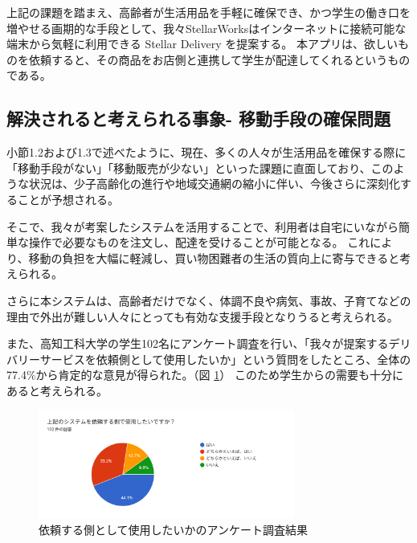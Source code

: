 上記の課題を踏まえ、高齢者が生活用品を手軽に確保でき、かつ学生の働き口を増やせる画期的な手段として、我々StellarWorksはインターネットに接続可能な端末から気軽に利用できる Stellar Delivery を提案する。
本アプリは、欲しいものを依頼すると、その商品をお店側と連携して学生が配達してくれるというものである。

\subsection{解決されると考えられる事象- 移動手段の確保問題}

小節1.2および1.3で述べたように、現在、多くの人々が生活用品を確保する際に「移動手段がない」「移動販売が少ない」といった課題に直面しており、このような状況は、少子高齢化の進行や地域交通網の縮小に伴い、今後さらに深刻化することが予想される。

そこで、我々が考案したシステムを活用することで、利用者は自宅にいながら簡単な操作で必要なものを注文し、配達を受けることが可能となる。
これにより、移動の負担を大幅に軽減し、買い物困難者の生活の質向上に寄与できると考えられる。

さらに本システムは、高齢者だけでなく、体調不良や病気、事故、子育てなどの理由で外出が難しい人々にとっても有効な支援手段となりうると考えられる。 

また、高知工科大学の学生102名にアンケート調査を行い、「我々が提案するデリバリーサービスを依頼側として使用したいか」という質問をしたところ、全体の77.4\%から肯定的な意見が得られた。（図 \ref{fig:アンケート2}） 
このため学生からの需要も十分にあると考えられる。 

\begin{figure}[H]
  \centering
  \includegraphics[width=0.75\textwidth]{依頼する側として使用したいか_アンケート結果.png}
  \caption{依頼する側として使用したいかのアンケート調査結果}
  \label{fig:アンケート2}
\end{figure}


